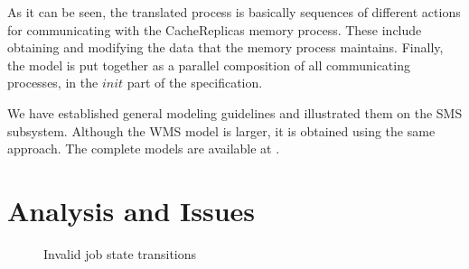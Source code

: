 \documentclass[10pt,conference]{IEEEtran}
\begin{document}
As it can be seen, the translated process is basically sequences of
different actions for communicating with the CacheReplicas memory process. 
These include obtaining and modifying the data that the memory process maintains. 
Finally, the model is put together as a parallel composition of all
communicating processes, in the \begin{math}init\end{math}
part of the specification.

We have established general modeling guidelines and illustrated them
on the SMS subsystem. Although the WMS model is larger, it is obtained using the same approach.
The complete models are available at \cite{svn_mcrl2}.

\section{Analysis and Issues}
\label{sec:Section_4}

\begin{figure}[t!]
  \centering
  \hfill
  \caption{Invalid job state transitions}
  \label{fig:Simulator-job-trace}
\end{figure}
\end{document}
